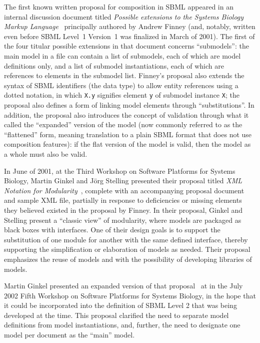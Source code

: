 The first known written proposal for composition in SBML appeared in an
internal discussion document titled \emph{Possible extensions to the
  Systems Biology Markup Language}~\cite{x} principally authored by
Andrew Finney (and, notably, written even before SBML Level~1 Version~1
was finalized in March of 2001).  The first of the four titular possible
extensions in that document concerns ``submodels'': the main model in a
file can contain a list of submodels, each of which are model
definitions only, and a list of submodel instantiations, each of which
are references to elements in the submodel list.  Finney's proposal also
extends the syntax of SBML identifiers (the  data type) to
allow entity references using a dotted notation, in which \texttt{X.y}
signifies element \texttt{y} of submodel instance \texttt{X}; the
proposal also defines a form of linking model elements through
``substitutions''.  In addition, the proposal also introduces the
concept of validation through what it called the ``expanded'' version of
the model (now commonly referred to as the ``flattened'' form, meaning
translation to a plain SBML format that does not use composition
features): if the flat version of the model is valid, then the model as
a whole must also be valid.

In June of 2001, at the Third Workshop on Software Platforms for Systems
Biology, Martin Ginkel and J\"{o}rg Stelling presented their proposal
titled \emph{XML Notation for Modularity}~\cite{x}, complete with an
accompanying proposal document and sample XML file, partially in
response to deficiencies or missing elements they believed existed in
the proposal by Finney.  In their proposal, Ginkel and Stelling present
a ``classic view'' of modularity, where models are packaged as black
boxes with interfaces.  One of their design goals is to support the
substitution of one module for another with the same defined interface,
thereby supporting the simplification or elaboration of models as
needed.  Their proposal emphasizes the reuse of models and with the
possibility of developing libraries of models.

Martin Ginkel presented an expanded version of that proposal~\cite{x} at
in the July 2002 Fifth Workshop on Software Platforms for Systems
Biology, in the hope that it could be incorporated into the definition
of SBML Level 2 that was being developed at the time.  This proposal
clarified the need to separate model definitions from model
instantiations, and, further, the need to designate one model per
document as the ``main'' model.

